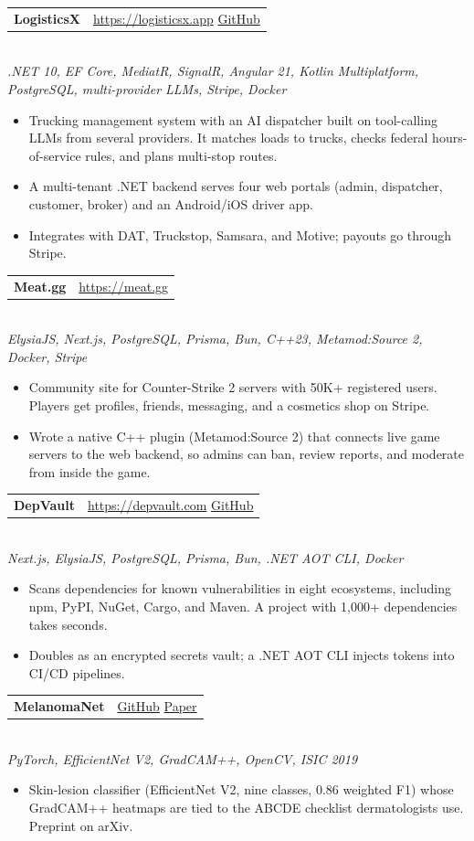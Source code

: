 \documentclass[letterpaper,11pt]{article}
\makeatletter
\newcommand{\projectEntry}[3]{%
    \vspace{2pt}\noindent
    \begin{tabular*}{\textwidth}{@{}l@{\extracolsep{\fill}}r@{}}
        {\textbf{\color{accent}#1}} & {\small\href{#3}{\color{linkcolor}#3}} \\
    \end{tabular*}\vspace{-3pt}\\
    {\small\color{lighttext}\textit{#2}}\vspace{-2pt}
}
\newcommand{\projectEntryDual}[4]{%
    \vspace{2pt}\noindent
    \begin{tabular*}{\textwidth}{@{}l@{\extracolsep{\fill}}r@{}}
        {\textbf{\color{accent}#1}} & {\small\href{#3}{\color{linkcolor}#3} \enspace\color{lighttext}\textbar\enspace \href{#4}{\color{linkcolor}GitHub}} \\
    \end{tabular*}\vspace{-3pt}\\
    {\small\color{lighttext}\textit{#2}}\vspace{-2pt}
}
\newcommand{\projectEntryPaper}[4]{%
    \vspace{2pt}\noindent
    \begin{tabular*}{\textwidth}{@{}l@{\extracolsep{\fill}}r@{}}
        {\textbf{\color{accent}#1}} & {\small\href{#3}{\color{linkcolor}GitHub} \enspace\color{lighttext}\textbar\enspace \href{#4}{\color{linkcolor}Paper}} \\
    \end{tabular*}\vspace{-3pt}\\
    {\small\color{lighttext}\textit{#2}}\vspace{-2pt}
}
\makeatother
\begin{document}
\projectEntryDual{LogisticsX}{.NET 10, EF Core, MediatR, SignalR, Angular 21, Kotlin Multiplatform, PostgreSQL, multi-provider LLMs, Stripe, Docker}
{https://logisticsx.app}
{https://github.com/suxrobgm/logistics-app}
\begin{itemize}
    \item Trucking management system with an AI dispatcher built on tool-calling LLMs from several providers. It matches loads to trucks, checks federal hours-of-service rules, and plans multi-stop routes.
    \item A multi-tenant .NET backend serves four web portals (admin, dispatcher, customer, broker) and an Android/iOS driver app.
    \item Integrates with DAT, Truckstop, Samsara, and Motive; payouts go through Stripe.
\end{itemize}

\projectEntry{Meat.gg}{ElysiaJS, Next.js, PostgreSQL, Prisma, Bun, C++23, Metamod:Source 2, Docker, Stripe}
{https://meat.gg}
\begin{itemize}
    \item Community site for Counter-Strike 2 servers with 50K+ registered users. Players get profiles, friends, messaging, and a cosmetics shop on Stripe.
    \item Wrote a native C++ plugin (Metamod:Source 2) that connects live game servers to the web backend, so admins can ban, review reports, and moderate from inside the game.
\end{itemize}

\projectEntryDual{DepVault}{Next.js, ElysiaJS, PostgreSQL, Prisma, Bun, .NET AOT CLI, Docker}
{https://depvault.com}
{https://github.com/suxrobGM/depvault}
\begin{itemize}
    \item Scans dependencies for known vulnerabilities in eight ecosystems, including npm, PyPI, NuGet, Cargo, and Maven. A project with 1,000+ dependencies takes seconds.
    \item Doubles as an encrypted secrets vault; a .NET AOT CLI injects tokens into CI/CD pipelines.
\end{itemize}

\projectEntryPaper{MelanomaNet}{PyTorch, EfficientNet V2, GradCAM++, OpenCV, ISIC 2019}
{https://github.com/suxrobgm/explainable-melanoma}
{https://arxiv.org/abs/2512.09289}
\begin{itemize}
    \item Skin-lesion classifier (EfficientNet V2, nine classes, 0.86 weighted F1) whose GradCAM++ heatmaps are tied to the ABCDE checklist dermatologists use. Preprint on arXiv.
\end{itemize}
\end{document}
